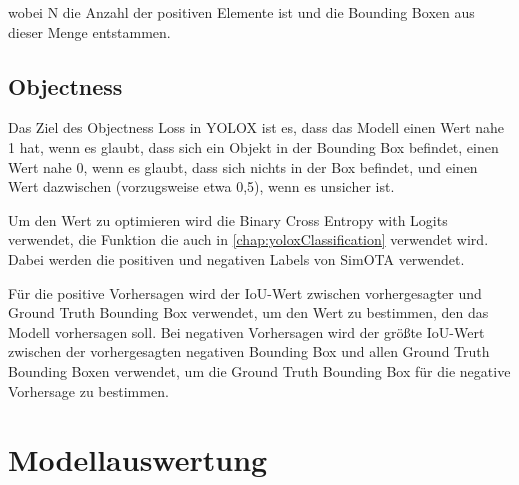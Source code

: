 wobei N die Anzahl der positiven Elemente ist und die Bounding Boxen aus dieser Menge entstammen. \cite{yoloxExplanationHowWorks}

\subsection{Objectness}
Das Ziel des Objectness Loss in YOLOX ist es, dass das Modell einen Wert nahe 1 hat, wenn es glaubt, dass sich ein Objekt in der Bounding Box befindet, einen Wert nahe 0, wenn es glaubt, dass sich nichts in der Box befindet, und einen Wert dazwischen (vorzugsweise etwa 0,5), wenn es unsicher ist.

Um den Wert zu optimieren wird die Binary Cross Entropy with Logits verwendet, die Funktion die auch in \ref{chap:yoloxClassification} verwendet wird. Dabei werden die positiven und negativen Labels von SimOTA verwendet.

Für die positive Vorhersagen wird der IoU-Wert zwischen vorhergesagter und Ground Truth Bounding Box verwendet, um den Wert zu bestimmen, den das Modell vorhersagen soll. Bei negativen Vorhersagen wird der größte IoU-Wert zwischen der vorhergesagten negativen Bounding Box und allen Ground Truth Bounding Boxen verwendet, um die Ground Truth Bounding Box für die negative Vorhersage zu bestimmen. \cite{yoloxExplanationHowWorks}

\section{Modellauswertung}